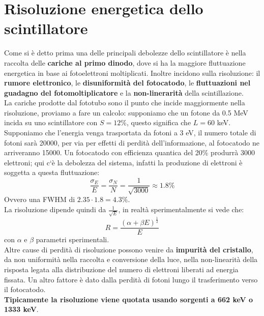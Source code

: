\section{Risoluzione energetica dello scintillatore}
Come si \`e detto prima una delle principali debolezze dello scintillatore \`e nella raccolta delle \textbf{cariche al primo dinodo}, dove si ha la maggiore fluttuazione
energetica in base ai fotoelettroni moltiplicati. 
Inoltre incidono sulla risoluzione: il \textbf{rumore elettronico}, le \textbf{disuniformit\`a del fotocatodo}, le \textbf{fluttuazioni nel guadagno del fotomoltiplicatore}
e la \textbf{non-linerarit\`a} della scintillazione.\\
La cariche prodotte dal fototubo sono il punto che incide maggiormente nella risoluzione, proviamo a fare un calcolo:
supponiamo che un fotone da 0.5 MeV incida su uno scintillatore con $S = 12\%$, questo significa che $L = 60$ keV.
Supponiamo che l'energia venga trasportata da fotoni a 3 eV, il numero totale di fotoni sar\`a 20000, per via per effetti di perdit\`a dell'informazione,
al fotocatodo ne arriveranno 15000. 
Un fotocatodo con efficienza quantica del 20\% produrr\`a 3000 elettroni; qui c`\`e la debolezza del sistema, infatti la produzione di elettroni \`e soggetta a questa
fluttuazione:
\begin{equation*}
\frac{\sigma_E}{E}  = \frac{\sigma_N}{N} = \frac{1}{\sqrt{3000}} \approx 1.8\%
\end{equation*}
Ovvero una FWHM di $2.35 \cdot 1.8 = 4.3 \%$.\\
La risoluzione dipende quindi da $\frac{1}{\sqrt{E}}$, in realt\`a sperimentalmente si vede che:
\begin{equation*}
R = \frac{(\alpha + \beta E)^{\frac{1}{2}}}{E}
\end{equation*}
con $\alpha$ e $\beta$ parametri sperimentali.\\
Altre cause di perdit\`a di risoluzione possono venire da \textbf{impurit\`a del cristallo}, da non uniformit\`a nella raccolta e conversione della luce,
nella non-linearit\`a della risposta legata alla distribuzione del numero di elettroni liberati ad energia fissata.
Un altro fattore \`e dato dalla perdit\`a di fotoni lungo il trasferimento verso il fotocatodo.\\
\textbf{Tipicamente la risoluzione viene quotata usando sorgenti a 662 keV o 1333 keV}.
